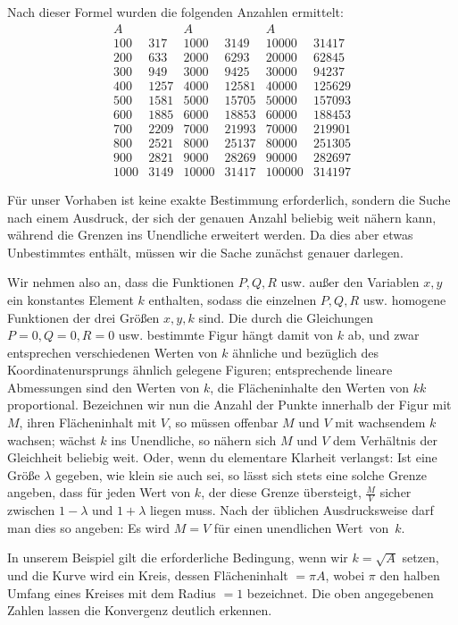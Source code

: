 Nach dieser Formel wurden die folgenden Anzahlen ermittelt:
\[
\begin{array}{r|r||r|r||r|r}
A&&A&&A&\\\hline
100&317&1000&3149&10000&31417\\
200&633&2000&6293&20000&62845\\
300&949&3000&9425&30000&94237\\
400&1257&4000&12581&40000&125629\\
500&1581&5000&15705&50000&157093\\
600&1885&6000&18853&60000&188453\\
700&2209&7000&21993&70000&219901\\
800&2521&8000&25137&80000&251305\\
900&2821&9000&28269&90000&282697\\
1000&3149&10000&31417&100000&314197
\end{array}
\]

Für unser Vorhaben ist keine exakte Bestimmung erforderlich, sondern die Suche nach einem Ausdruck, der sich der genauen Anzahl beliebig weit nähern kann, während die Grenzen ins Unendliche erweitert werden. Da dies aber etwas Unbestimmtes enthält, müssen wir die Sache zunächst genauer darlegen.

Wir nehmen also an, dass die Funktionen $P,Q,R$ usw. außer den Variablen $x,y$ ein konstantes Element $k$ enthalten, sodass die einzelnen $P,Q,R$ usw. homogene Funktionen der drei Größen $x,y,k$ sind. Die durch die Gleichungen $P=0,Q=0,R=0$ usw. bestimmte Figur hängt damit von $k$ ab, und zwar entsprechen verschiedenen Werten von $k$ ähnliche und bezüglich des Koordinatenursprungs ähnlich gelegene Figuren; entsprechende lineare Abmessungen sind den Werten von $k$, die Flächeninhalte den Werten von $kk$ proportional. Bezeichnen wir nun die Anzahl der Punkte innerhalb der Figur mit $M$, ihren Flächeninhalt mit $V$, so müssen offenbar $M$ und $V$ mit wachsendem $k$ wachsen; wächst $k$ ins Unendliche, so nähern sich $M$ und $V$ dem Verhältnis der Gleichheit beliebig weit. Oder, wenn du elementare Klarheit verlangst: Ist eine Größe $\lambda$ gegeben, wie klein sie auch sei, so lässt sich stets eine solche Grenze angeben, dass für jeden Wert von $k$, der diese Grenze übersteigt, $\frac MV$ sicher zwischen $1-\lambda$ und $1+\lambda$ liegen muss. Nach der üblichen Ausdrucksweise darf man dies so angeben: Es wird $M=V$ für einen unendlichen \mbox{Wert von $k$}.

In unserem Beispiel gilt die erforderliche Bedingung, wenn wir $k=\surd A$ setzen, und die Kurve wird ein Kreis, dessen Flächeninhalt $=\pi A$, wobei $\pi$ den halben Umfang eines Kreises mit dem Radius $=1$ bezeichnet. Die oben angegebenen Zahlen lassen die Konvergenz deutlich erkennen.

